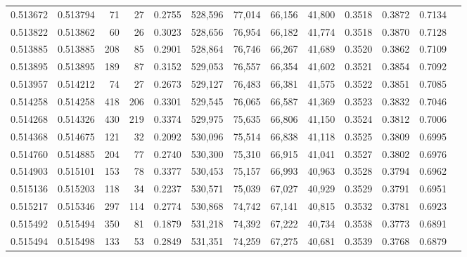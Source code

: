 \begin{tabular}{rrrrrrrrrrrrr}
0.513672 & 0.513794 &    71 &    27 &                                     0.2755 & 528,596 &  77,014 &  66,156 &  41,800 & 0.3518 & 0.3872 & 0.7134 \\
0.513822 & 0.513862 &    60 &    26 &                                     0.3023 & 528,656 &  76,954 &  66,182 &  41,774 & 0.3518 & 0.3870 & 0.7128 \\
0.513885 & 0.513885 &   208 &    85 &                                     0.2901 & 528,864 &  76,746 &  66,267 &  41,689 & 0.3520 & 0.3862 & 0.7109 \\
0.513895 & 0.513895 &   189 &    87 &                                     0.3152 & 529,053 &  76,557 &  66,354 &  41,602 & 0.3521 & 0.3854 & 0.7092 \\
0.513957 & 0.514212 &    74 &    27 &                                     0.2673 & 529,127 &  76,483 &  66,381 &  41,575 & 0.3522 & 0.3851 & 0.7085 \\
0.514258 & 0.514258 &   418 &   206 &                                     0.3301 & 529,545 &  76,065 &  66,587 &  41,369 & 0.3523 & 0.3832 & 0.7046 \\
0.514268 & 0.514326 &   430 &   219 &                                     0.3374 & 529,975 &  75,635 &  66,806 &  41,150 & 0.3524 & 0.3812 & 0.7006 \\
0.514368 & 0.514675 &   121 &    32 &                                     0.2092 & 530,096 &  75,514 &  66,838 &  41,118 & 0.3525 & 0.3809 & 0.6995 \\
0.514760 & 0.514885 &   204 &    77 &                                     0.2740 & 530,300 &  75,310 &  66,915 &  41,041 & 0.3527 & 0.3802 & 0.6976 \\
0.514903 & 0.515101 &   153 &    78 &                                     0.3377 & 530,453 &  75,157 &  66,993 &  40,963 & 0.3528 & 0.3794 & 0.6962 \\
0.515136 & 0.515203 &   118 &    34 &                                     0.2237 & 530,571 &  75,039 &  67,027 &  40,929 & 0.3529 & 0.3791 & 0.6951 \\
0.515217 & 0.515346 &   297 &   114 &                                     0.2774 & 530,868 &  74,742 &  67,141 &  40,815 & 0.3532 & 0.3781 & 0.6923 \\
0.515492 & 0.515494 &   350 &    81 &                                     0.1879 & 531,218 &  74,392 &  67,222 &  40,734 & 0.3538 & 0.3773 & 0.6891 \\
0.515494 & 0.515498 &   133 &    53 &                                     0.2849 & 531,351 &  74,259 &  67,275 &  40,681 & 0.3539 & 0.3768 & 0.6879 \\

\end{tabular}
